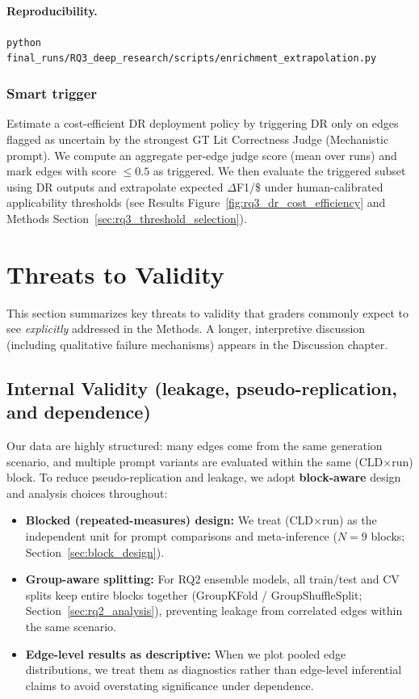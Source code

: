 \paragraph{Reproducibility.}
\texttt{python final\_runs/RQ3\_deep\_research/scripts/enrichment\_extrapolation.py}

\subsubsection{Smart trigger}\label{sec:rq3_smart_trigger}
\noindent Estimate a cost-efficient DR deployment policy by triggering DR only on edges flagged as uncertain by the strongest GT Lit Correctness Judge (Mechanistic prompt). We compute an aggregate per-edge judge score (mean over runs) and mark edges with score $\leq 0.5$ as triggered. We then evaluate the triggered subset using DR outputs and extrapolate expected $\Delta$F1/\$ under human-calibrated applicability thresholds (see Results Figure~\ref{fig:rq3_dr_cost_efficiency} and Methods Section~\ref{sec:rq3_threshold_selection}).

\endgroup

\section{Threats to Validity}
\label{sec:threats_to_validity}

This section summarizes key threats to validity that graders commonly expect to see \emph{explicitly} addressed in the Methods. A longer, interpretive discussion (including qualitative failure mechanisms) appears in the Discussion chapter.

\subsection{Internal Validity (leakage, pseudo-replication, and dependence)}
Our data are highly structured: many edges come from the same generation scenario, and multiple prompt variants are evaluated within the same (CLD$\times$run) block. To reduce pseudo-replication and leakage, we adopt \textbf{block-aware} design and analysis choices throughout:
\begin{itemize}[noitemsep]
    \item \textbf{Blocked (repeated-measures) design:} We treat (CLD$\times$run) as the independent unit for prompt comparisons and meta-inference ($N=9$ blocks; Section~\ref{sec:block_design}).
    \item \textbf{Group-aware splitting:} For RQ2 ensemble models, all train/test and CV splits keep entire blocks together (GroupKFold / GroupShuffleSplit; Section~\ref{sec:rq2_analysis}), preventing leakage from correlated edges within the same scenario.
    \item \textbf{Edge-level results as descriptive:} When we plot pooled edge distributions, we treat them as diagnostics rather than edge-level inferential claims to avoid overstating significance under dependence.
\end{itemize}

